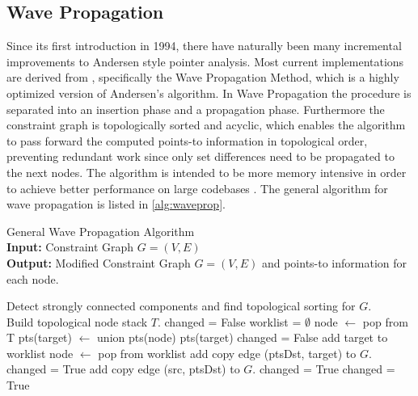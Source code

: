 \subsection{Wave Propagation}
Since its first introduction in 1994, there have naturally been many incremental improvements to Andersen style pointer analysis.
Most current implementations are derived from \cite{waveprop}, specifically the Wave Propagation Method, which is a highly optimized version of Andersen's algorithm.
In Wave Propagation the procedure is separated into an insertion phase and a propagation phase. Furthermore the constraint graph is topologically sorted and acyclic, which enables the algorithm to pass forward the computed points-to information in topological order, preventing redundant work since only set differences need to be propagated to the next nodes. The algorithm is intended to be more memory intensive in order to achieve better performance on large codebases \cite{waveprop}.
The general algorithm for wave propagation is listed in \autoref{alg:waveprop}.

\begin{algorithm}
    \caption{General Wave Propagation Algorithm \\ \textbf{Input:} Constraint Graph $G=(V,E)$ \\ \textbf{Output:} Modified Constraint Graph $G=(V,E)$ and points-to information for each node.}\label{alg:waveprop}
    \begin{algorithmic}
        \State Detect strongly connected components and find topological sorting for $G$. \\ Build topological node stack $T$.
        \Repeat
        \State changed = False
        \State worklist = $\emptyset$
        \State node $\leftarrow$ pop from T
        \State pts(target) $\leftarrow$ union pts(node) pts(target)
        \State changed = False
        \State add target to worklist
        \EndIf
        \EndFor
        \EndWhile
        \State node $\leftarrow$ pop from worklist
        \State add copy edge (ptsDst, target) to $G$.
        \State changed = True
        \EndIf
        \EndFor
        \EndFor
        \State add copy edge (src, ptsDst) to $G$.
        \State changed = True
        \EndIf
        \EndFor
        \EndFor
        \EndWhile
        \State changed = True
        \EndIf
    \end{algorithmic}
\end{algorithm}

